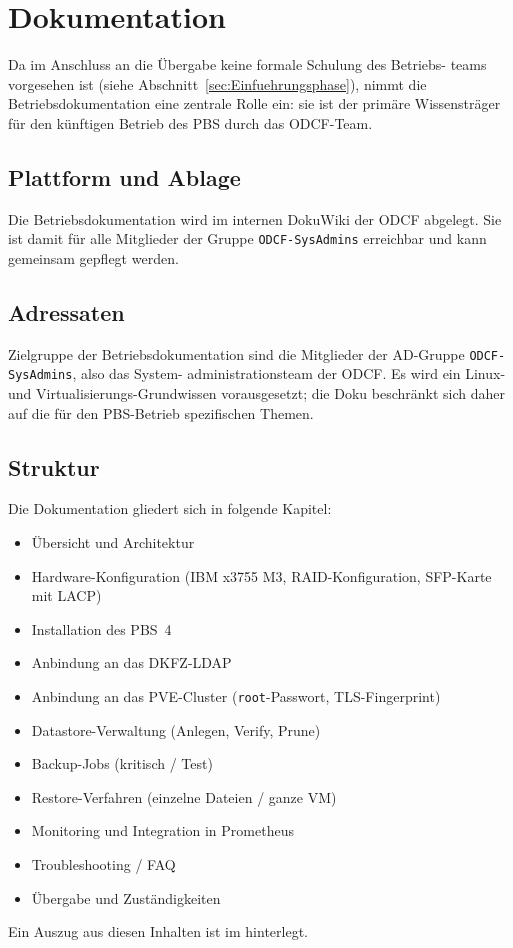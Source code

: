 \section{Dokumentation}
\label{sec:Dokumentation}

Da im Anschluss an die Übergabe keine formale Schulung des Betriebs-
teams vorgesehen ist (siehe Abschnitt~\ref{sec:Einfuehrungsphase}),
nimmt die Betriebsdokumentation eine zentrale Rolle ein: sie ist
der primäre Wissensträger für den künftigen Betrieb des \ac{PBS}
durch das \ac{ODCF}-Team.

\subsection{Plattform und Ablage}
Die Betriebsdokumentation wird im internen DokuWiki der \ac{ODCF}
abgelegt. Sie ist damit für alle Mitglieder der Gruppe
\texttt{ODCF-SysAdmins} erreichbar und kann gemeinsam gepflegt
werden.

\subsection{Adressaten}
Zielgruppe der Betriebsdokumentation sind die Mitglieder der
\ac{AD}-Gruppe \texttt{ODCF-SysAdmins}, also das System-
administrationsteam der \ac{ODCF}. Es wird ein Linux- und
Virtualisierungs-Grundwissen vorausgesetzt; die Doku beschränkt
sich daher auf die für den \ac{PBS}-Betrieb spezifischen Themen.

\subsection{Struktur}
Die Dokumentation gliedert sich in folgende Kapitel:
\begin{itemize}
    \item Übersicht und Architektur
    \item Hardware-Konfiguration (IBM x3755 M3, \ac{RAID}-Konfiguration,
          \ac{SFP}-Karte mit \ac{LACP})
    \item Installation des \ac{PBS}~4
    \item Anbindung an das \ac{DKFZ}-\ac{LDAP}
    \item Anbindung an das \ac{PVE}-Cluster (\texttt{root}-Passwort,
          TLS-Fingerprint)
    \item Datastore-Verwaltung (Anlegen, Verify, Prune)
    \item Backup-Jobs (kritisch / Test)
    \item Restore-Verfahren (einzelne Dateien / ganze \ac{VM})
    \item Monitoring und Integration in Prometheus
    \item Troubleshooting / FAQ
    \item Übergabe und Zuständigkeiten
\end{itemize}
Ein Auszug aus diesen Inhalten ist im
 hinterlegt.
